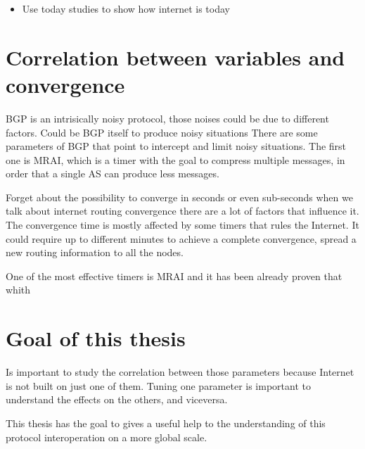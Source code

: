 \begin{itemize}
    \item Use today studies to show how internet is today
\end{itemize}


\section{Correlation between variables and convergence}
\label{sec:bgp_correlations}


\ac{BGP} is an intrisically noisy protocol, those noises could be due to different
factors.
Could be \ac{BGP} itself to produce noisy situations
There are some parameters of \ac{BGP} that point to intercept and limit noisy 
situations.
The first one is \ac{MRAI}, which is a timer with the goal to compress multiple
messages, in order that a single \ac{AS} can produce less messages.

Forget about the possibility to converge in seconds or even sub-seconds
when we talk about internet routing convergence there are a lot of factors
that influence it.
The convergence time is mostly affected by some timers that rules the Internet.
It could require up to different minutes to achieve a complete convergence, 
spread a new routing information to all the nodes.

One of the most effective timers is \ac{MRAI} and it has been already
proven  that whith 

\section{Goal of this thesis}
\label{sec:thesis_goal}


Is important to study the correlation between those parameters because Internet
is not built on just one of them.
Tuning one parameter is important to understand the effects on the others, and
viceversa.

This thesis has the goal to gives a useful help to the understanding of this
protocol interoperation on a more global scale.
